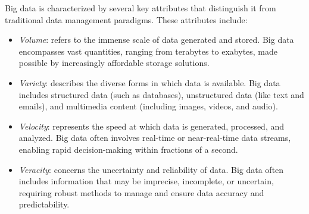 Big data is characterized by several key attributes that distinguish it from traditional data management paradigms. 
These attributes include:
\begin{itemize}
    \item \textit{Volume}: refers to the immense scale of data generated and stored. 
        Big data encompasses vast quantities, ranging from terabytes to exabytes, made possible by increasingly affordable storage solutions.
    \item \textit{Variety}: describes the diverse forms in which data is available. 
        Big data includes structured data (such as databases), unstructured data (like text and emails), and multimedia content (including images, videos, and audio).
    \item \textit{Velocity}: represents the speed at which data is generated, processed, and analyzed. 
        Big data often involves real-time or near-real-time data streams, enabling rapid decision-making within fractions of a second.
    \item \textit{Veracity}: concerns the uncertainty and reliability of data. 
        Big data often includes information that may be imprecise, incomplete, or uncertain, requiring robust methods to manage and ensure data accuracy and predictability.
\end{itemize}   

